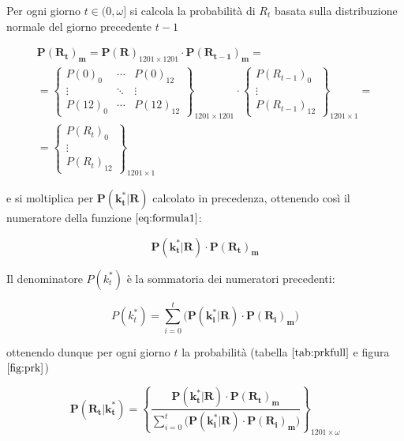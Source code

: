 \documentclass[11pt]{article}
\begin{document}
    
    Per ogni giorno \(t \in (0, \omega]\) si calcola la probabilità di
\(R_t\) basata sulla distribuzione normale del giorno precedente \(t-1\)

    \begin{equation}\label{eq:prgiorno}
\begin{gathered}
\mathbf{P(R_t)_m} = \mathbf{P(R)}_{1201 \times 1201} \cdot \mathbf{P(R_{t-1})_m} = \\ %
= \begin{Bmatrix}
P(0)_{0} & \cdots & P(0)_{12} \\ 
\vdots & \ddots & \vdots \\
P(12)_{0} & \cdots & P(12)_{12}
\end{Bmatrix}_{1201 \times 1201}
\cdot
\begin{Bmatrix}
P(R_{t-1})_0  \\
\vdots \\ 
P(R_{t-1})_{12}
\end{Bmatrix}_{1201 \times 1} = \\ %
= \begin{Bmatrix}
P(R_{t})_0 \\
\vdots \\ 
P(R_{t})_{12}
\end{Bmatrix}_{1201 \times 1}
\end{gathered}
\end{equation}

    e si moltiplica per \(\mathbf{P(k_t^*|R)}\) calcolato in precedenza,
ottenendo così il numeratore della funzione \(\eqref{eq:formula1}\):

\begin{equation}\label{eq:numeratoreok}
\mathbf{P(k_t^*|R)} \cdot \mathbf{P(R_t)_m}
\end{equation}

Il denominatore \(P(k_t^*)\) è la sommatoria dei numeratori precedenti:

    \begin{equation}\label{eq:denominatoreok}
P(k_t^*) = \sum_{i=0}^{t} \bigg( \mathbf{P(k_i^*|R)} \cdot \mathbf{P(R_i)_m} \bigg)
\end{equation}

    ottenendo dunque per ogni giorno \(t\) la probabilità (tabella
\(\ref{tab:prkfull}\) e figura \(\ref{fig:prk}\))

\begin{equation}\label{eq:finale}
\mathbf{P(R_t|k_t^*)} = 
\left\{
\frac{ \mathbf{P(k_t^*|R)} \cdot \mathbf{P(R_t)_m} }{ 
\sum_{i=0}^{t} \bigg( \mathbf{P(k_i^*|R)} \cdot \mathbf{P(R_i)_m} \bigg)
}
\right\}_{1201 \times \omega}
\end{equation}
\end{document}
